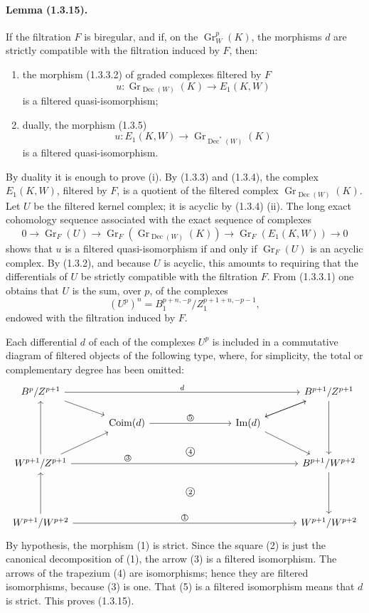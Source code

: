 \documentclass[10pt]{article}
\newcommand{\Gr}{\operatorname{Gr}}
\newcommand{\Coim}{\operatorname{Coim}}
\newcommand{\Imop}{\operatorname{Im}}
\newcommand{\Dec}{\operatorname{Dec}}
\begin{document}
\paragraph{Lemma (1.3.15).} If the filtration $F$ is biregular, and if, on the $\Gr_W^p(K)$, the morphisms $d$ are strictly compatible with the filtration induced by $F$, then:
\begin{enumerate}[label=(\roman*)]
\item the morphism (1.3.3.2) of graded complexes filtered by $F$
\[
u:\Gr_{\Dec(W)}(K)\longrightarrow E_1(K,W)
\]
is a filtered quasi-isomorphism;
\item dually, the morphism (1.3.5)
\[
u:E_1(K,W)\longrightarrow \Gr_{\Dec^*(W)}(K)
\]
is a filtered quasi-isomorphism.
\end{enumerate}
By duality it is enough to prove (i). By (1.3.3) and (1.3.4), the complex $E_1(K,W)$, filtered by $F$, is a quotient of the filtered complex $\Gr_{\Dec(W)}(K)$. Let $U$ be the filtered kernel complex; it is acyclic by (1.3.4) (ii). The long exact cohomology sequence associated with the exact sequence of complexes
\[
0\to\Gr_F(U)\to\Gr_F(\Gr_{\Dec(W)}(K))\to\Gr_F(E_1(K,W))\to0
\]
shows that $u$ is a filtered quasi-isomorphism if and only if $\Gr_F(U)$ is an acyclic complex. By (1.3.2), and because $U$ is acyclic, this amounts to requiring that the differentials of $U$ be strictly compatible with the filtration $F$. From (1.3.3.1) one obtains that $U$ is the sum, over $p$, of the complexes
\[
(U^p)^n=B_1^{p+n,-p}/Z_1^{p+1+n,-p-1},
\]
endowed with the filtration induced by $F$.

Each differential $d$ of each of the complexes $U^p$ is included in a commutative diagram of filtered objects of the following type, where, for simplicity, the total or complementary degree has been omitted:
\[
\begin{tikzcd}[column sep=3.2em,row sep=1.4em]
B^p/Z^{p+1} \arrow[rrrr,"d"] \arrow[dr]
  & & & & B^{p+1}/Z^{p+1} \arrow[dl] \arrow[dd] \\
  & \Coim(d) \arrow[rr,"{\text{\textcircled{\scriptsize 5}}}"]
  & & \Imop(d) \arrow[ur] \arrow[dr] & \\
W^{p+1}/Z^{p+1} \arrow[uu] \arrow[ur] \arrow[rrrr,"{\text{\textcircled{\scriptsize 3}}}" near start]
  & & {\text{\raisebox{1.2em}{\textcircled{\scriptsize 4}}}} & & B^{p+1}/W^{p+2} \arrow[dd] \\
  & & {\text{\textcircled{\scriptsize 2}}} & & \\
W^{p+1}/W^{p+2} \arrow[uu] \arrow[rrrr,"{\text{\textcircled{\scriptsize 1}}}"]
  & & & & W^{p+1}/W^{p+2}
\end{tikzcd}
\]
By hypothesis, the morphism (1) is strict. Since the square (2) is just the canonical decomposition of (1), the arrow (3) is a filtered isomorphism. The arrows of the trapezium (4) are isomorphisms; hence they are filtered isomorphisms, because (3) is one. That (5) is a filtered isomorphism means that $d$ is strict. This proves (1.3.15).
\end{document}
